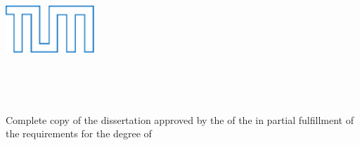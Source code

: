 \begin{titlepage}


\sffamily

\begin{addmargin}[-1.5cm]{-1.5cm}

\begin{center}


\includegraphics[height=18mm]{Figures/TUM_Logos/tumlogo}



\bigskip

\LARGE{\spacedlowsmallcaps{\myUni}}

\medskip

\large{\myDepartment}

\bigskip
\bigskip
\bigskip

{\LARGE\spacedlowsmallcaps{\textcolor{tumblau}{\myTitle}} \\
}

\bigskip
\bigskip

{\Large\spacedlowsmallcaps{\myName}} \\

\bigskip
\bigskip
\bigskip

\end{center}

\noindent\large{Complete copy of the dissertation approved by the \myFaculty of the \myUni in partial fulfillment of the requirements for the degree of} 

\medskip

\centerline{\emph{\myDegree}}

\bigskip
\bigskip
\medskip


%
%
%
%




\end{addmargin}
\end{titlepage}

